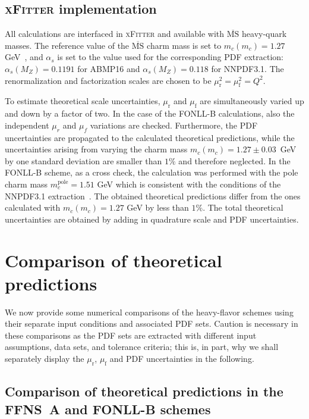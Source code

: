 \documentclass[pdftex,twocolumn,epjc3]{svjour3}          %
\newcommand{\abmp} {ABMP16\xspace}
\newcommand{\nnpdf} {NNPDF3.1\xspace}
\newcommand{\xfitter} {\textsc{xFitter}\xspace}
\newcommand{\fonll} {{FONLL-B}\xspace}
\newcommand{\ffns} {{FFNS~A}\xspace}
\begin{document}
%
\subsection{\xfitter implementation}

All calculations are interfaced in \xfitter and available with
$\overline{\mbox{MS}}$ heavy-quark masses. The reference value of the
$\overline{\mbox{MS}}$ charm mass is set to $m_c(m_c) = 1.27$
GeV~\cite{Tanabashi:2018oca}, and $\alpha_s$ is set to the value used
for the corresponding PDF extraction: $\alpha_s(M_Z) = 0.1191$ for
\abmp and $\alpha_s(M_Z) = 0.118$ for \nnpdf.  The renormalization and
factorization scales are chosen to be
$\mu_\mathrm{r}^2 = \mu_\mathrm{f}^2 = Q^2$.

To estimate theoretical scale uncertainties, $\mu_\mathrm{r}$ and
$\mu_\mathrm{f}$ are simultaneously varied up and down by a factor of 
two. In the case of the \fonll calculations, also the independent
$\mu_r$ and $\mu_f$ variations are checked. Furthermore, the PDF
uncertainties are propagated to the calculated theoretical
predictions, while the uncertainties arising from varying the charm
mass $m_c(m_c) = 1.27 \pm 0.03$~GeV by one standard deviation are
smaller than $1\%$ and therefore neglected. In the \fonll scheme, as a
cross check, the calculation was performed with the pole charm mass
$m_c^{\text{pole}} = 1.51$ GeV which is consistent with the conditions
of the \nnpdf extraction~\cite{Ball:2017nwa}. The obtained theoretical
predictions differ from the ones calculated with $m_c(m_c) = 1.27$ GeV
by less than $1\%$. The total theoretical uncertainties are obtained
by adding in quadrature scale and PDF uncertainties.

%
\section{Comparison of theoretical predictions}
\label{sec:thpred-comparison}

We now provide some numerical comparisons of the heavy-flavor schemes
using their separate input conditions and associated PDF sets.
%
Caution is necessary in these comparisons as the PDF sets are
extracted with different input assumptions, data sets, and tolerance
criteria; this is, in part, why we shall separately display the
$\mu_\mathrm{r}$, $\mu_\mathrm{f}$  and PDF
uncertainties in the following.

%
\subsection{Comparison of theoretical predictions in the \ffns and \fonll schemes}
\label{sec:compareI}
\end{document}

